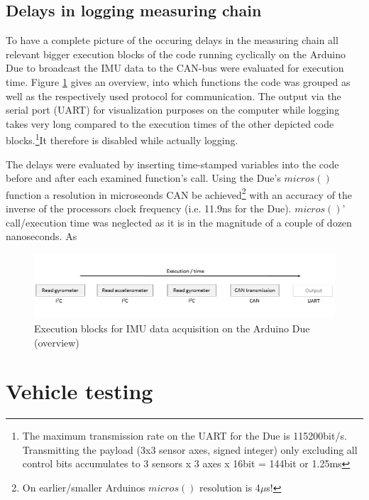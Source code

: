 \documentclass[ExampleMasters.tex]{subfiles}
\begin{document}
\subsection{Delays in logging measuring chain}
\label{sec:delays_on_arduino}

To have a complete picture of the occuring delays in the measuring chain all relevant bigger execution blocks of the code running cyclically on the Arduino Due to broadcast the \gls{IMU} data to the CAN-bus were evaluated for execution time. Figure \ref{fig:arduino_delays_sketch} gives an overview, into which functions the code was grouped as well as the respectively used protocol for communication. The output via the serial port (\gls{UART}) for visualization purposes on the computer while logging takes very long compared to the execution times of the other depicted code blocks.\footnote{The maximum transmission rate on the \gls{UART} for the Due is 115200bit/s. Transmitting the payload (3x3 sensor axes, signed integer) only excluding all control bits accumulates to 3 sensors x 3 axes x 16bit = 144bit  or 1.25ms}It therefore is disabled while actually logging. 

The delays were evaluated by inserting time-stamped variables into the code before and after each examined function's call. Using the Due's $micros()$ function a resolution in microseonds \gls{CAN} be achieved\footnote{On earlier/smaller Arduinos $micros()$ resolution is 4$\mu$s!} with an accuracy of the inverse of the processors clock frequency (i.e. 11.9ns for the Due). $micros()$' call/execution time was neglected as it is in the magnitude of a couple of dozen nanoseconds. As 

\begin{figure}[h!]
\centering
\includegraphics[width=1\linewidth]{figures/arduino_delays_sketch}
\caption{Execution blocks for \gls{IMU} data acquisition on the Arduino Due (overview)}
\label{fig:arduino_delays_sketch}
\end{figure}


\section{Vehicle testing}
\label{sec:vehicle-testing}
\end{document}
